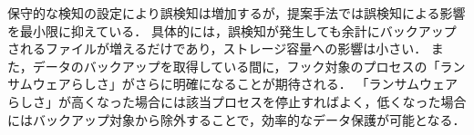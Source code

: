 保守的な検知の設定により誤検知は増加するが，提案手法では誤検知による影響を最小限に抑えている．
具体的には，誤検知が発生しても余計にバックアップされるファイルが増えるだけであり，ストレージ容量への影響は小さい．
また，データのバックアップを取得している間に，フック対象のプロセスの「ランサムウェアらしさ」がさらに明確になることが期待される．
「ランサムウェアらしさ」が高くなった場合には該当プロセスを停止すればよく，低くなった場合にはバックアップ対象から除外することで，効率的なデータ保護が可能となる．



